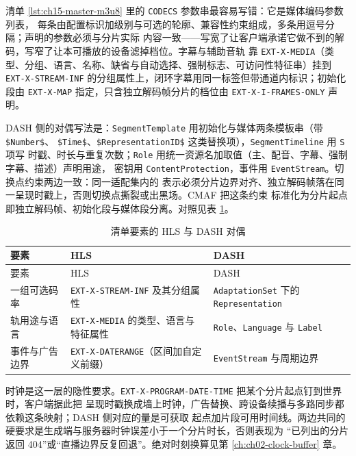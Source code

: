 \documentclass[12pt,a4paper,fontset=fandol]{ctexbook}
\newcommand{\Tp}[1]{\texttt{#1}}
\begin{document}
清单 \ref{lst:ch15-master-m3u8} 里的 \Tp{CODECS} 参数串最容易写错：它是媒体编码参数列表，
每条由配置标识加级别与可选的轮廓、兼容性约束组成，多条用逗号分隔；声明的参数必须与分片实际
内容一致——写宽了让客户端承诺它做不到的解码，写窄了让本可播放的设备滤掉档位。字幕与辅助音轨
靠 \Tp{EXT-X-MEDIA}（类型、分组、语言、名称、缺省与自动选择、强制标志、可访问性特征串）挂到
\Tp{EXT-X-STREAM-INF} 的分组属性上，闭环字幕用同一标签但带通道内标识；初始化段由
\Tp{EXT-X-MAP} 指定，只含独立解码帧分片的档位由 \Tp{EXT-X-I-FRAMES-ONLY} 声明。

DASH 侧的对偶写法是：\Tp{SegmentTemplate} 用初始化与媒体两条模板串（带 \Tp{\$Number\$}、
\Tp{\$Time\$}、\Tp{\$RepresentationID\$} 这类替换项），\Tp{SegmentTimeline} 用 \Tp{S} 项写
时戳、时长与重复次数；\Tp{Role} 用统一资源名加取值（主、配音、字幕、强制字幕、描述）声明用途，
密钥用 \Tp{ContentProtection}，事件用 \Tp{EventStream}。切换点约束两边一致：同一适配集内的
表示必须分片边界对齐、独立解码帧落在同一呈现时戳上，否则切换点撕裂或出黑场。CMAF 把这条约束
标准化为分片起点即独立解码帧、初始化段与媒体段分离。对照见表 \ref{tab:ch15-hls-dash}。

\begin{longtable}{@{}>{\raggedright\arraybackslash\footnotesize}p{} >{\raggedright\arraybackslash\footnotesize}p{} >{\raggedright\arraybackslash\footnotesize}p{}@{}}
\caption{清单要素的 HLS 与 DASH 对偶}\label{tab:ch15-hls-dash} \\
\toprule
要素 & HLS & DASH \\
\midrule
\endfirsthead
\toprule
要素 & HLS & DASH \\
\midrule
\endhead
\bottomrule
\endfoot
\endlastfoot
一组可选码率 & \Tp{EXT-X-STREAM-INF} 及其分组属性 & \Tp{AdaptationSet} 下的 \Tp{Representation} \\
轨用途与语言 & \Tp{EXT-X-MEDIA} 的类型、语言与特征属性 & \Tp{Role}、\Tp{Language} 与 \Tp{Label} \\
事件与广告边界 & \Tp{EXT-X-DATERANGE}（区间加自定义前缀） & \Tp{EventStream} 与周期边界 \\
\end{longtable}

时钟是这一层的隐性要求。\Tp{EXT-X-PROGRAM-DATE-TIME} 把某个分片起点钉到世界时，客户端据此把
呈现时戳换成墙上时钟，广告替换、跨设备续播与多路同步都依赖这条映射；DASH 侧对应的量是可获取
起点加片段可用时间线。两边共同的硬要求是生成端与服务器时钟误差小于一个分片时长，否则表现为
``已列出的分片返回 404''或``直播边界反复回退''。绝对时刻换算见第 \ref{ch:ch02-clock-buffer} 章。
\end{document}
